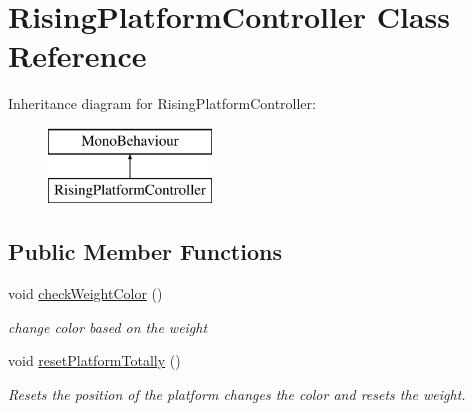 \hypertarget{class_rising_platform_controller}{}\section{Rising\+Platform\+Controller Class Reference}
\label{class_rising_platform_controller}
Inheritance diagram for Rising\+Platform\+Controller\+:\begin{figure}[H]
\begin{center}
\leavevmode
\includegraphics[height=2.000000cm]{class_rising_platform_controller}
\end{center}
\end{figure}
\subsection*{Public Member Functions}
\begin{DoxyCompactItemize}
\item 
void \hyperlink{class_rising_platform_controller_a469cee8bbb405ae5915d5e9096fa674b}{check\+Weight\+Color} ()
\begin{DoxyCompactList}\small\item\em change color based on the weight \end{DoxyCompactList}\item 
void \hyperlink{class_rising_platform_controller_a522fc81dfd4bb686de380fb5fa0c5535}{reset\+Platform\+Totally} ()
\begin{DoxyCompactList}\small\item\em Resets the position of the platform changes the color and resets the weight. \end{DoxyCompactList}\end{DoxyCompactItemize}
